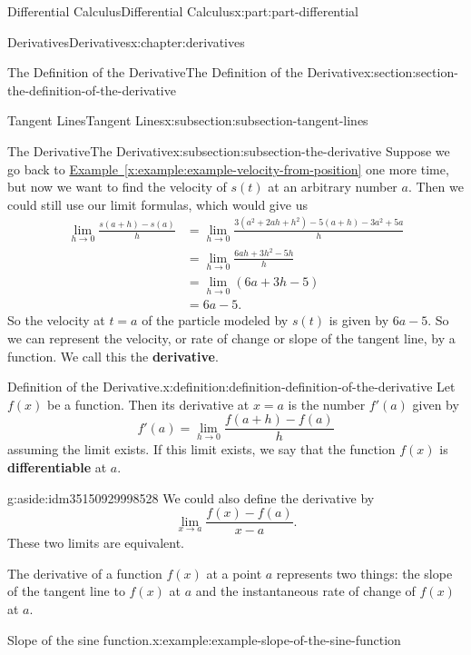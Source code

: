 \documentclass[twoside,10pt,]{tufte-book}
\newcommand{\xreffont}{\relax}
\newcommand{\terminology}[1]{\textbf{#1}}
\numberwithin{equation}{part}
\begin{document}
\begin{partptx}{Differential Calculus}{}{Differential Calculus}{}{}{x:part:part-differential}
\begin{chapterptx}{Derivatives}{}{Derivatives}{}{}{x:chapter:derivatives}
\begin{sectionptx}{The Definition of the Derivative}{}{The Definition of the Derivative}{}{}{x:section:section-the-definition-of-the-derivative}
\begin{subsectionptx}{Tangent Lines}{}{Tangent Lines}{}{}{x:subsection:subsection-tangent-lines}
\end{subsectionptx}
%
%
\typeout{************************************************}
\typeout{************************************************}
%
\begin{subsectionptx}{The Derivative}{}{The Derivative}{}{}{x:subsection:subsection-the-derivative}
Suppose we go back to \hyperref[x:example:example-velocity-from-position]{Example~{\xreffont\ref{x:example:example-velocity-from-position}}} one more time, but now we want to find the velocity of \(s(t)\) at an arbitrary number \(a\). Then we could still use our limit formulas, which would give us%
%
\begin{align*}
\lim_{h\to0}\frac{s(a+h)-s(a)}{h} & = \lim_{h\to0}\frac{3(a^{2}+2ah+h^{2})-5(a+h) - 3a^{2} + 5a}{h} \\
& = \lim_{h\to0}\frac{6ah+3h^{2} - 5h}{h} \\
& = \lim_{h\to0}(6a+3h-5) \\
& = 6a-5. 
\end{align*}
So the velocity at \(t=a\) of the particle modeled by \(s(t)\) is given by \(6a-5\). So we can represent the velocity, or rate of change or slope of the tangent line, by a function. We call this the \terminology{derivative}.%
\begin{definition}{Definition of the Derivative.}{x:definition:definition-definition-of-the-derivative}%
%
%
Let \(f(x)\) be a function. Then its derivative at \(x=a\) is the number \(f'(a)\) given by%
\begin{equation*}
f'(a) = \lim_{h\to0}\frac{f(a+h)-f(a)}{h}
\end{equation*}
assuming the limit exists. If this limit exists, we say that the function \(f(x)\) is \terminology{differentiable} at \(a\).%
\end{definition}
\begin{aside}{}{g:aside:idm35150929998528}%
We could also define the derivative by%
\begin{equation*}
\lim_{x\to a}\frac{f(x)-f(a)}{x-a}.
\end{equation*}
These two limits are equivalent.%
\end{aside}
The derivative of a function \(f(x)\) at a point \(a\) represents two things: the slope of the tangent line to \(f(x)\) at \(a\) and the instantaneous rate of change of \(f(x)\) at \(a\).%
\begin{example}{Slope of the sine function.}{x:example:example-slope-of-the-sine-function}%

\end{example}
\end{subsectionptx}
\end{sectionptx}
\end{chapterptx}
\end{partptx}
\end{document}
